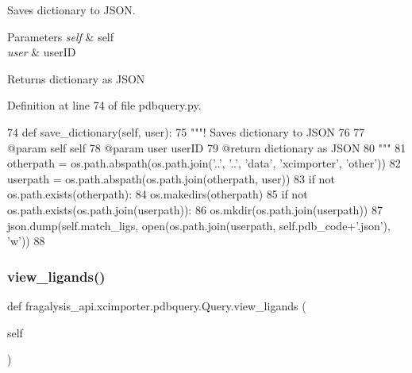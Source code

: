 Saves dictionary to J\+S\+ON. 


\begin{DoxyParams}{Parameters}
{\em self} & self \\
\hline
{\em user} & user\+ID \\
\hline
\end{DoxyParams}
\begin{DoxyReturn}{Returns}
dictionary as J\+S\+ON 
\end{DoxyReturn}


Definition at line 74 of file pdbquery.\+py.


\begin{DoxyCode}
74     \textcolor{keyword}{def }save\_dictionary(self, user):
75         \textcolor{stringliteral}{"""! Saves dictionary to JSON }
76 \textcolor{stringliteral}{}
77 \textcolor{stringliteral}{        @param self self}
78 \textcolor{stringliteral}{        @param user userID}
79 \textcolor{stringliteral}{        @return dictionary as JSON}
80 \textcolor{stringliteral}{        """}
81         otherpath = os.path.abspath(os.path.join(\textcolor{stringliteral}{'..'}, \textcolor{stringliteral}{'..'}, \textcolor{stringliteral}{'data'}, \textcolor{stringliteral}{'xcimporter'}, \textcolor{stringliteral}{'other'}))
82         userpath = os.path.abspath(os.path.join(otherpath, user))
83         \textcolor{keywordflow}{if} \textcolor{keywordflow}{not} os.path.exists(otherpath):
84             os.makedirs(otherpath)
85         \textcolor{keywordflow}{if} \textcolor{keywordflow}{not} os.path.exists(os.path.join(userpath)):
86             os.mkdir(os.path.join(userpath))
87         json.dump(self.match\_ligs, open(os.path.join(userpath, self.pdb\_code+\textcolor{stringliteral}{'.json'}), \textcolor{stringliteral}{'w'}))
88 
\end{DoxyCode}
\mbox{\label{classfragalysis__api_1_1xcimporter_1_1pdbquery_1_1_query_ada4ce4d98d911a33baabe42bf38a4aa1}} 
\subsubsection{\texorpdfstring{view\+\_\+ligands()}{view\_ligands()}}
{\footnotesize\ttfamily def fragalysis\+\_\+api.\+xcimporter.\+pdbquery.\+Query.\+view\+\_\+ligands (\begin{DoxyParamCaption}\item[{}]{self }\end{DoxyParamCaption})}



